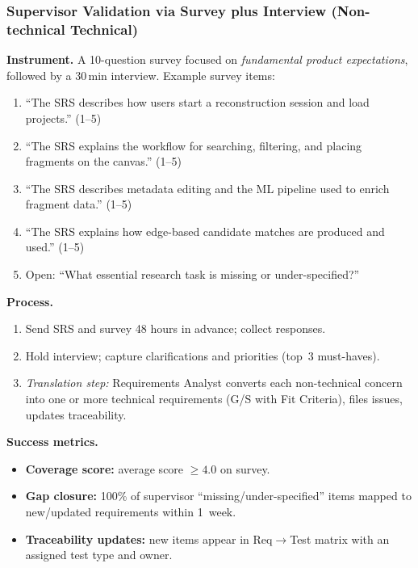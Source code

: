 \documentclass[12pt, titlepage]{article}
\begin{document}
\subsubsection*{Supervisor Validation via Survey plus Interview (Non-technical \textrightarrow{} Technical)}
\textbf{Instrument.} A 10-question survey focused on \emph{fundamental product expectations}, followed by a 30\,min interview. Example survey items:
\begin{enumerate}
  \item ``The SRS describes how users start a reconstruction session and load projects.'' (1--5)
  \item ``The SRS explains the workflow for searching, filtering, and placing fragments on the canvas.'' (1--5)
  \item ``The SRS describes metadata editing and the ML pipeline used to enrich fragment data.'' (1--5)
  \item ``The SRS explains how edge-based candidate matches are produced and used.'' (1--5)
  \item Open: ``What essential research task is missing or under-specified?''
\end{enumerate}
\textbf{Process.}
\begin{enumerate}
  \item Send SRS and survey 48 hours in advance; collect responses.
  \item Hold interview; capture clarifications and priorities (top~3 must-haves).
  \item \emph{Translation step:} Requirements Analyst converts each non-technical concern into one or more technical requirements (G/S with Fit Criteria), files issues, updates traceability.
\end{enumerate}
\textbf{Success metrics.}
\begin{itemize}
  \item \textbf{Coverage score:} average score $\geq 4.0$ on survey.
  \item \textbf{Gap closure:} 100\% of supervisor ``missing/under-specified'' items mapped to new/updated requirements within 1~week.
  \item \textbf{Traceability updates:} new items appear in Req$\rightarrow$Test matrix with an assigned test type and owner.
\end{itemize}
\end{document}
